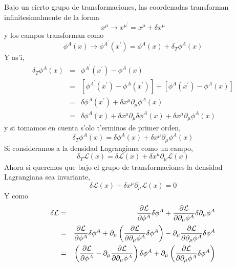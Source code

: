 Bajo un cierto grupo de transformaciones, las coordenadas transforman
infinitesimalmente de la forma
\begin{equation}
x^{\mu }\rightarrow x^{\mu ^{\prime }}=x^{\mu }+\delta x^{\mu }
\end{equation}
y los campos transforman como
\begin{equation}
\phi ^{A}(x) \rightarrow \phi ^{A^{\prime }}\left( x^{\prime
}\right) =\phi ^{A}(x) +\delta _{T}\phi ^{A}(x) 
\end{equation}
Y as'i,
\begin{eqnarray*}
\delta _{T}\phi ^{A}(x) &=&\phi ^{A^{\prime }}\left( x^{\prime
}\right) -\phi ^{A}(x) \\
&=&\left[ \phi ^{A^{\prime }}\left( x^{\prime }\right) -\phi ^{A}\left(
x^{\prime }\right) \right] +\left[ \phi ^{A}\left( x^{\prime }\right) -\phi
^{A}(x) \right] \\
&=&\delta \phi ^{A}\left( x^{\prime }\right) +\delta x^{\mu }\partial _{\mu
}\phi ^{A}(x) \\
&=&\delta \phi ^{A}(x) +\delta x^{\mu }\partial _{\mu }\delta
\phi ^{A}(x) +\delta x^{\mu }\partial _{\mu }\phi ^{A}\left(
x\right) 
\end{eqnarray*}
y si tomamos en cuenta s'olo t'erminos de primer orden,
\begin{equation}
\delta _{T}\phi ^{A}(x) =\delta \phi ^{A}(x) +\delta
x^{\mu }\partial _{\mu }\phi ^{A}(x) 
\end{equation}
Si consideramos a la densidad Lagrangiana como un campo,
\begin{equation}
\delta _{T}\mathcal{L}(x) =\delta \mathcal{L}(x)
+\delta x^{\mu }\partial _{\mu }\mathcal{L}(x) 
\end{equation}
Ahora si queremos que bajo el grupo de transformaciones la densidad
Lagrangiana sea invariante,
\begin{equation}
\delta \mathcal{L}(x) +\delta x^{\mu }\partial _{\mu }\mathcal{L}%
(x) =0
\end{equation}
Y como
\begin{eqnarray*}
\delta \mathcal{L} &=&\frac{\partial \mathcal{L}}{\partial \phi ^{A}}\delta
\phi ^{A}+\frac{\partial \mathcal{L}}{\partial \partial _{\mu }\phi ^{A}}%
\delta \partial _{\mu }\phi ^{A} \\
&=&\frac{\partial \mathcal{L}}{\partial \phi ^{A}}\delta \phi ^{A}+\partial
_{\mu }\left( \frac{\partial \mathcal{L}}{\partial \partial _{\mu }\phi ^{A}}%
\delta \phi ^{A}\right) -\partial _{\mu }\frac{\partial \mathcal{L}}{%
\partial \partial _{\mu }\phi ^{A}}\delta \phi ^{A} \\
&=&\left( \frac{\partial \mathcal{L}}{\partial \phi ^{A}}-\partial _{\mu }%
\frac{\partial \mathcal{L}}{\partial \partial _{\mu }\phi ^{A}}\right)
\delta \phi ^{A}+\partial _{\mu }\left( \frac{\partial \mathcal{L}}{\partial
\partial _{\mu }\phi ^{A}}\delta \phi ^{A}\right) 
\end{eqnarray*}
